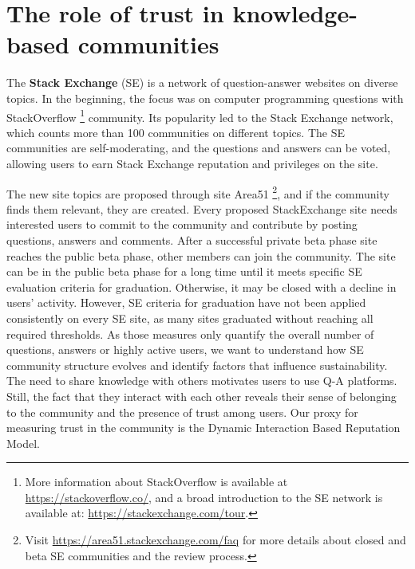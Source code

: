 
\chapter{The role of trust in knowledge-based communities} %
\label{Ch:Trust}


The \textbf{Stack Exchange} (SE) is a network of question-answer websites on diverse topics. In the beginning, the focus was on computer programming questions with StackOverflow \footnote{
	More information about StackOverflow is available at \url{https://stackoverflow.co/}, and a broad introduction to the SE network is available at: \url{https://stackexchange.com/tour}. 
}  community. Its popularity led to the Stack Exchange network, which counts more than 100 communities on different topics. The SE communities are self-moderating, and the questions and answers can be voted, allowing users to earn Stack Exchange reputation and privileges on the site. 

The new site topics are proposed through site Area51 \footnote{Visit \url{https://area51.stackexchange.com/faq} for more details about closed and beta SE communities and the review process.}, and if the community finds them relevant, they are created. Every proposed  StackExchange site needs interested users to commit to the community and contribute by posting questions, answers and comments. After a successful private beta phase site reaches the public beta phase, other members can join the community. The site can be in the public beta phase for a long time until it meets specific SE evaluation criteria for graduation. Otherwise, it may be closed with a decline in users’ activity. However, SE criteria for graduation have not been applied consistently on every SE site, as many sites graduated without reaching all required thresholds. As those measures only quantify the overall number of questions, answers or highly active users, we want to understand how SE community structure evolves and identify factors that influence sustainability. The need to share knowledge with others motivates users to use Q-A platforms. Still, the fact that they interact with each other reveals their sense of belonging to the community and the presence of trust among users. Our proxy for measuring trust in the community is the Dynamic Interaction Based Reputation Model.

